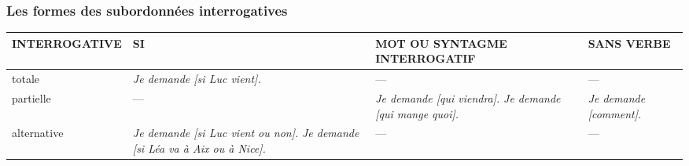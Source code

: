 \documentclass[UTF8]{report}
\begin{document}
\subsubsection{Les formes des subordonnées interrogatives}
\begin{table}[H]
    \centering

    \begin{tabular}{| L{3.5cm} | L{4cm} | L{4.5cm} | L{3cm} |}
    \hline
    \textbf{INTERROGATIVE} & \textbf{SI} & \textbf{MOT OU SYNTAGME \newline INTERROGATIF} & \textbf{SANS VERBE} \\
    \hline
    totale & \textit{Je demande [si Luc vient].} & — & — \\
    \hline
    partielle & — & \textit{Je demande [qui viendra].} \newline \textit{Je demande [qui mange quoi].} & \textit{Je demande [comment].} \\
    \hline
    alternative & \textit{Je demande [si Luc vient ou non].} \newline \textit{Je demande [si Léa va à Aix ou à Nice].} & — & — \\
    \hline
    \end{tabular}
\end{table}
\end{document}
